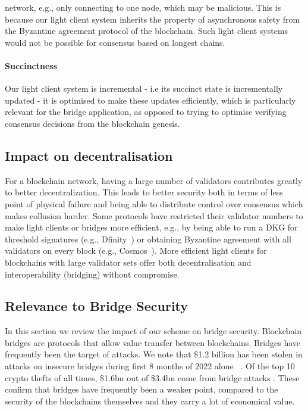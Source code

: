 network, e.g., only connecting to one node, which may be malicious. This is because our light client system inherits the property of asynchronous safety from the Byzantine agreement
protocol of the blockchain. Such light client systems would not be possible for consensus based on longest chains.
\vspace{-0.2cm}
\noindent\paragraph{Succinctness}Our light client system is incremental - i.e its succinct state is incrementally updated - it is optimised to make these updates efficiently, which is particularly relevant for the bridge application, as opposed to trying to optimise verifying consensus decisions from the blockchain genesis.
\vspace{-0.2cm}
\subsection{Impact on decentralisation} For a blockchain network, having  a large number of validators  contributes greatly to better decentralization. This leads to better security both in terms of less point of physical failure and being able to distribute control over consensus which makes collusion harder. Some protocols have restricted their validator numbers to make light clients or bridges more efficient, e.g., by being able to run a DKG for threshold signatures (e.g., Dfinity~\cite{dfinity}) or obtaining Byzantine agreement with all validators on every block (e.g., Cosmos~\cite{tendermint_paper}). More efficient light clients for blockchains with large validator sets offer both decentralisation and interoperability (bridging) without compromise.

\vspace{-0.25cm}
\subsection{Relevance to Bridge Security}
\noindent In this section we review the impact of our scheme on bridge security. Blockchain bridges are protocols that allow value transfer between blockchains. Bridges have frequently been the target of attacks. We note that \$1.2 billion has been stolen in attacks on insecure bridges during first 8 months of 2022 alone ~\cite{elliptic_harmony,elliptic_nomad}. Of the top 10 crypto thefts of all times, \$1.6bn out of \$3.4bn come from bridge attacks \cite{elliptic_nomad}. These confirm that bridges have frequently been a weaker point, compared to the security of the blockchains themselves and they carry a lot of economical value.

